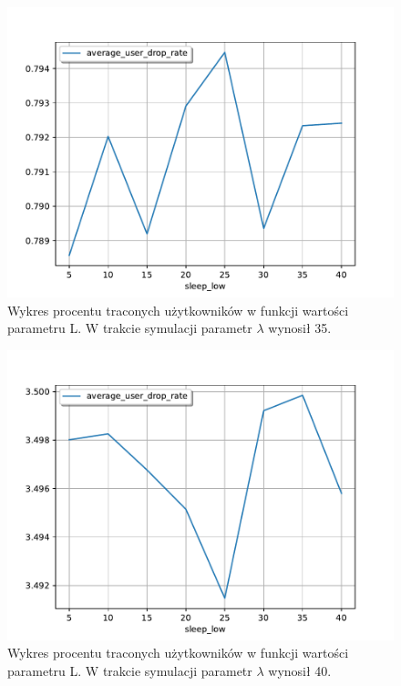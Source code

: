 \begin{figure}[h!]
\center
\includegraphics[scale=0.65]{img/drop_rate_lambda_35.pdf} 
\caption{Wykres procentu traconych użytkowników w funkcji wartości parametru L. W trakcie symulacji parametr $\lambda$ wynosił 35.}
\label{dropped_users_iter_l}
\end{figure}

\begin{figure}[h!]
\center
\includegraphics[scale=0.65]{img/drop_rate_lambda_40.pdf} 
\caption{Wykres procentu traconych użytkowników w funkcji wartości parametru L. W trakcie symulacji parametr $\lambda$ wynosił 40.}
\label{dropped_users_iter_l2}
\end{figure}

